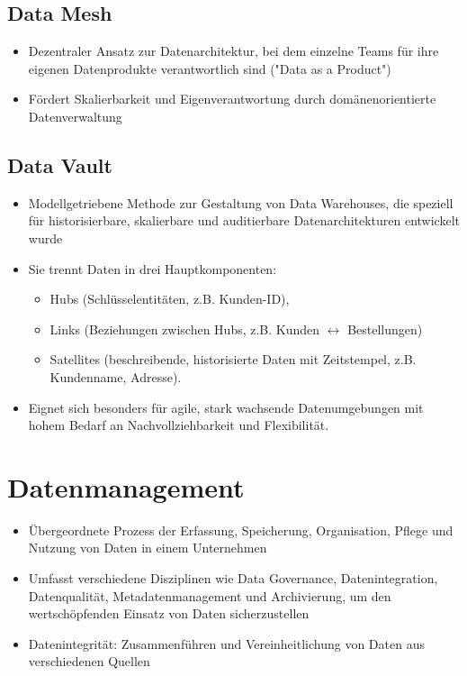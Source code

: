 \documentclass[11pt]{scrartcl}
\begin{document}
\subsection{Data Mesh}
\begin{itemize}
	\item Dezentraler Ansatz zur Datenarchitektur, bei dem einzelne Teams für ihre eigenen Datenprodukte verantwortlich sind ("Data as a Product")
	\item Fördert Skalierbarkeit und Eigenverantwortung durch domänenorientierte Datenverwaltung
\end{itemize}


\subsection{Data Vault}
\begin{itemize}
	\item Modellgetriebene Methode zur Gestaltung von Data Warehouses, die speziell für historisierbare, skalierbare und auditierbare Datenarchitekturen entwickelt wurde
	\item Sie trennt Daten in drei Hauptkomponenten:
	\begin{itemize}
		\item Hubs (Schlüsselentitäten, z.B. Kunden-ID),
		\item Links (Beziehungen zwischen Hubs, z.B. Kunden $ \leftrightarrow $ Bestellungen)
		\item Satellites (beschreibende, historisierte Daten mit Zeitstempel, z.B. Kundenname, Adresse).
	\end{itemize}
	\item Eignet sich besonders für agile, stark wachsende Datenumgebungen mit hohem Bedarf an Nachvollziehbarkeit und Flexibilität.
\end{itemize}


\newpage
\section{Datenmanagement}
\begin{itemize}
\item Übergeordnete Prozess der Erfassung, Speicherung, Organisation, Pflege und Nutzung von Daten in einem Unternehmen
\item Umfasst verschiedene Disziplinen wie Data Governance, Datenintegration, Datenqualität, Metadatenmanagement und Archivierung, um den wertschöpfenden Einsatz von Daten sicherzustellen
\item Datenintegrität: Zusammenführen und Vereinheitlichung von Daten aus verschiedenen Quellen 
\end{itemize}
\end{document}
